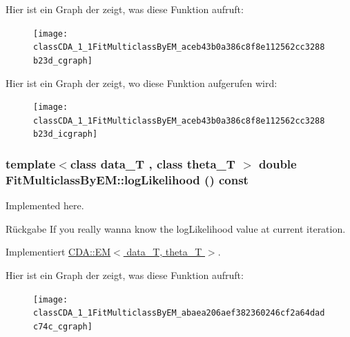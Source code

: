 Hier ist ein Graph der zeigt, was diese Funktion aufruft:\nopagebreak
\begin{figure}[H]
\begin{center}
\leavevmode
\texttt{[image: classCDA\_1\_1FitMulticlassByEM\_aceb43b0a386c8f8e112562cc3288b23d\_cgraph]}
\end{center}
\end{figure}




Hier ist ein Graph der zeigt, wo diese Funktion aufgerufen wird:\nopagebreak
\begin{figure}[H]
\begin{center}
\leavevmode
\texttt{[image: classCDA\_1\_1FitMulticlassByEM\_aceb43b0a386c8f8e112562cc3288b23d\_icgraph]}
\end{center}
\end{figure}


\hypertarget{classCDA_1_1FitMulticlassByEM_abaea206aef382360246cf2a64dadc74c}{
\subsubsection[{logLikelihood}]{\setlength{\rightskip}{0pt plus 5cm}template$<$class data\_\-T , class theta\_\-T $>$ double FitMulticlassByEM::logLikelihood () const}}
\label{classCDA_1_1FitMulticlassByEM_abaea206aef382360246cf2a64dadc74c}


Implemented here. 

\begin{DoxyReturn}{Rückgabe}
If you really wanna know the logLikelihood value at current iteration. 
\end{DoxyReturn}


Implementiert \hyperlink{classCDA_1_1EM_affb4273a70cd7562cc5d517412c4fcdb}{CDA::EM$<$ data\_\-T, theta\_\-T $>$}.



Hier ist ein Graph der zeigt, was diese Funktion aufruft:\nopagebreak
\begin{figure}[H]
\begin{center}
\leavevmode
\texttt{[image: classCDA\_1\_1FitMulticlassByEM\_abaea206aef382360246cf2a64dadc74c\_cgraph]}
\end{center}
\end{figure}


